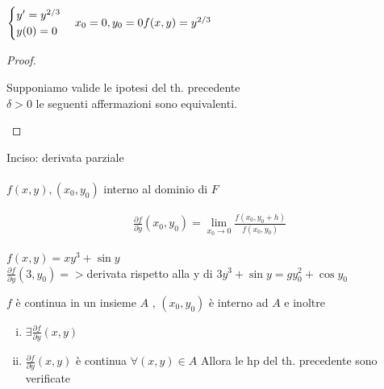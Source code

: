 \documentclass[a4paper, oneside]{article}
\begin{document}
\begin{example}
    
$   \begin{cases}
        y' = y^{2/3}\\
        y(0) = 0
    \end{cases}
    \\x_0 = 0, y_0 = 0
    \\f(x,y) = y^{2/3}
$
\end{example}

\begin{proof}
    \hfil\\
    \begin{lemma}
        Supponiamo valide le ipotesi del th. precedente
        \\ $\delta > 0$ le seguenti affermazioni sono equivalenti.

    \end{lemma}
\end{proof}

\begin{lemma}
    Inciso: derivata parziale 
    \\\\ $f(x,y) , (x_0, y_0)$ interno al dominio di $F$

    \begin{align*}
            \frac{\partial f}{\partial y}(x_0, y_0) = \lim_{x_0\to0}\frac{f(x_0, y_0 + h)}{f(x_0, y_0)}
    \end{align*}
\end{lemma}
    \begin{example}
     $f(x,y) = x y^3 + \sin{y}$
    \\$\frac{\partial f}{\partial y}(3,y_0) =>$derivata rispetto alla y di $3y^3 + \sin{y} = gy_0^2 + \cos{y_0}$    
    \end{example}
    
    \begin{lemma}    
     $f$ è continua in un insieme $A$ , $(x_0, y_0 )$ è interno ad $A$ e inoltre
    \begin{enumerate}[i)]    
    \item$\exists \frac{\partial f}{\partial y} (x,y)$
    \item$\frac{\partial f}{\partial y} (x,y)$ è continua $\forall (x,y) \in A$ Allora le hp del th. precedente sono verificate
    \end{enumerate}
    \end{lemma}
\end{document}
